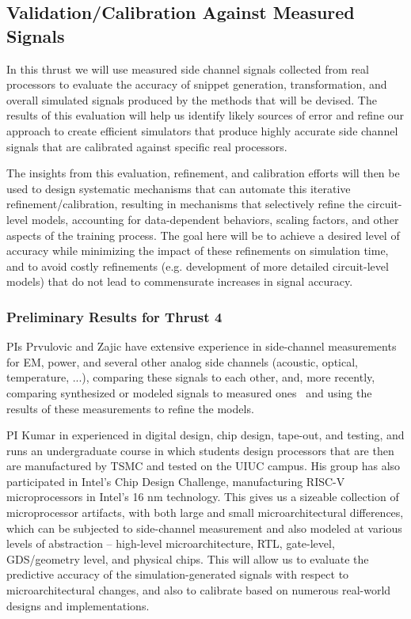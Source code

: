 \subsection{Validation/Calibration Against Measured Signals}

In this thrust we will use measured side channel signals collected from real processors to
evaluate the accuracy of snippet generation, transformation, and overall simulated signals produced by the methods that will be devised. The results of this evaluation will help us identify likely sources of error and refine our approach to create efficient simulators that produce highly accurate side channel signals that are calibrated against specific real processors.

The insights from this evaluation, refinement, and calibration efforts will then be used to design systematic mechanisms that can automate this iterative refinement/calibration, resulting in mechanisms that selectively refine the circuit-level models, accounting for data-dependent behaviors, scaling factors, and other aspects of the training process. The goal here will be to achieve a desired level of accuracy while minimizing the impact of these refinements on simulation time, and to avoid costly refinements (e.g. development of more detailed circuit-level models) that do not lead to commensurate increases in signal accuracy.

\subsubsection{Preliminary Results for Thrust 4}

PIs Prvulovic and Zajic have extensive experience in side-channel measurements for EM, power, and several other analog side channels (acoustic, optical, temperature, ...), comparing these signals to each other, and, more recently, comparing synthesized or modeled signals to measured ones~\cite{Nader2020} and using the results of these measurements to refine the models. 

PI Kumar in experienced in digital design, chip design,
tape-out, and testing, and runs an undergraduate course in which students design processors that are then are manufactured by TSMC and tested on the UIUC campus.
His group has also participated in Intel's Chip Design Challenge, manufacturing RISC-V microprocessors in Intel's 16 nm technology. This gives us a sizeable collection of microprocessor artifacts, with both large and small microarchitectural differences,
which can be subjected to side-channel measurement and also modeled at various levels of abstraction -- high-level microarchitecture, RTL, gate-level,
GDS/geometry level, and physical chips. This will allow us to evaluate the predictive accuracy of the simulation-generated signals with respect to microarchitectural changes,
and also to calibrate based on numerous real-world designs and implementations.

